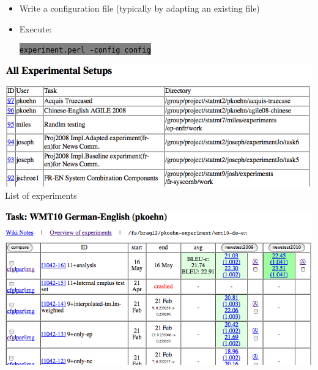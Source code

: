 \documentclass[landscape]{uedslides2C}
\newcommand{\littlecode}[1]{\colorbox{gray}{\textcolor{black}{\small \tt #1}}}
\begin{document}

\vspace{30mm}
\begin{itemize}
\item Write a configuration file
(typically by adapting an existing file)
\vspace{15mm}
\item Execute:
\vspace{-10mm}
\begin{center}
\littlecode{\normalsize experiment.perl -config config}
\end{center}
\end{itemize}


\begin{center}
\includegraphics[scale=1]{web-interface-experiments.png}\\[5mm]
List of experiments
\end{center}


\begin{center}\vspace{-9mm}
\includegraphics[scale=1]{web-interface-runs}
\end{center}
\end{document}
